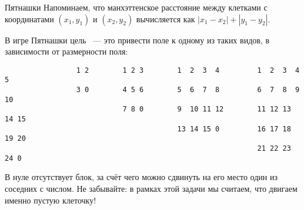 \begin{problem}{Пятнашки}{}{}{}{}
Напоминаем, что манхэттенское расстояние между клетками с координатами $(x_1, y_1)$ и $(x_2, y_2)$ вычисляется как $|x_1 - x_2| + |y_1 - y_2|$.

\Examples

\begin{example}
%
%
\end{example}

\Note
В игре Пятнашки цель ~--- это привести поле к одному из таких видов, в зависимости от размерности поля:
\begin{verbatim}
                 1 2        1 2 3        1  2  3  4         1  2  3  4  5
                 3 0        4 5 6        5  6  7  8         6  7  8  9  10
                            7 8 0        9  10 11 12        11 12 13 14 15
                                         13 14 15 0         16 17 18 19 20
                                                            21 22 23 24 0
\end{verbatim}
В нуле отсутствует блок, за счёт чего можно сдвинуть на его место один из соседних с числом. Не забывайте: в рамках этой задачи мы считаем, что двигаем именно пустую клеточку!

\end{problem}
